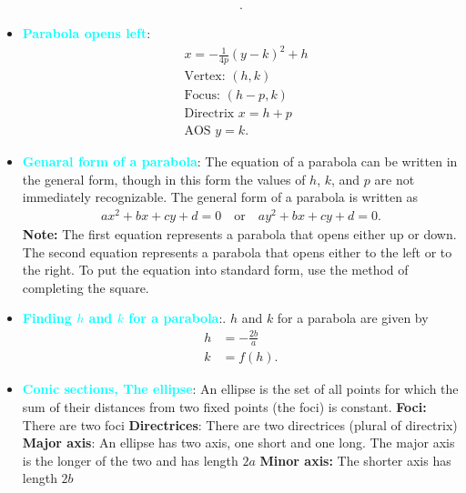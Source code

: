 \documentclass{report}
\begin{document}
\begin{itemize}
\begin{align*}
        .\end{align*}
        \bigbreak \noindent 
    \item \textbf{\textcolor{cyan}{Parabola opens left}}:
        \begin{align*}
            &x= -\frac{1}{4p}(y-k)^{2} + h \\
            &\text{Vertex: } (h,k) \\
            &\text{Focus: } (h-p,k) \\
            &\text{Directrix } x=h+p \\
            &\text{AOS } y=k
        .\end{align*}
        \bigbreak \noindent 
    \item \textbf{\textcolor{cyan}{Genaral form of a parabola}}:
        The equation of a parabola can be written in the general form, though in this form the values of $h$, $k$, and $p$ are not immediately recognizable. The general form of a parabola is written as
        \begin{align*}
             ax^2 + bx + cy + d = 0 \quad \text{or} \quad ay^2 + bx + cy + d = 0
        .\end{align*}
        \textbf{Note:} The first equation represents a parabola that opens either up or down. The second equation represents a parabola that opens either to the left or to the right. To put the equation into standard form, use the method of completing the square.
    \item \textbf{\textcolor{cyan}{Finding $h$ and $k$ for a parabola}}:. $h$ and $k$ for a parabola are given by
        \begin{align*}
            h &= -\frac{2b}{a} \\
            k &= f(h)
        .\end{align*}
    \item \textbf{\textcolor{cyan}{Conic sections, The ellipse}}:
        An ellipse is the set of all points for which the sum of their distances from two fixed points (the foci) is constant.
        \bigbreak \noindent 
        \bigbreak \noindent 
        \textbf{Foci:} There are two foci
        \smallbreak \noindent
        \textbf{Directrices}: There are two directrices (plural of directrix)
        \smallbreak \noindent
        \textbf{Major axis}: An ellipse has two axis, one short and one long. The major axis is the longer of the two and has length $2a$
        \smallbreak \noindent
        \textbf{Minor axis:} The shorter axis has length $2b$

\end{itemize}
\end{document}
